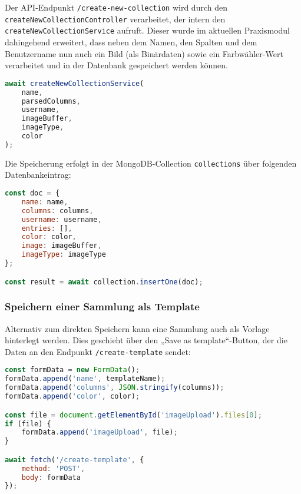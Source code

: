 Der API-Endpunkt \texttt{/create-new-collection} wird durch den \texttt{createNewCollectionController} verarbeitet, der intern den \texttt{createNewCollectionService} aufruft.
Dieser wurde im aktuellen Praxismodul dahingehend erweitert, dass neben dem Namen, den Spalten und dem Benutzername nun auch ein Bild (als Binärdaten) sowie ein Farbwähler-Wert verarbeitet und in der Datenbank gespeichert werden können.

\begin{lstlisting}[language=JavaScript, caption=Service-Aufruf im Controller]
await createNewCollectionService(
    name,
    parsedColumns,
    username,
    imageBuffer,
    imageType,
    color
);
\end{lstlisting}

Die Speicherung erfolgt in der MongoDB-Collection \texttt{collections} über folgenden Datenbankeintrag:

\begin{lstlisting}[language=JavaScript, caption=Dokumentstruktur im Service]
const doc = {
    name: name,
    columns: columns,
    username: username,
    entries: [],
    color: color,
    image: imageBuffer,
    imageType: imageType
};

const result = await collection.insertOne(doc);
\end{lstlisting}

\subsubsection{Speichern einer Sammlung als Template}\label{subsubsec:save-as-template}

Alternativ zum direkten Speichern kann eine Sammlung auch als Vorlage hinterlegt werden.
Dies geschieht über den „Save as template“-Button, der die Daten an den Endpunkt \texttt{/create-template} sendet:

\begin{lstlisting}[language=JavaScript, caption=Clientseitiges Speichern einer Sammlung als Vorlage]
const formData = new FormData();
formData.append('name', templateName);
formData.append('columns', JSON.stringify(columns));
formData.append('color', color);

const file = document.getElementById('imageUpload').files[0];
if (file) {
    formData.append('imageUpload', file);
}

await fetch('/create-template', {
    method: 'POST',
    body: formData
});
\end{lstlisting}

